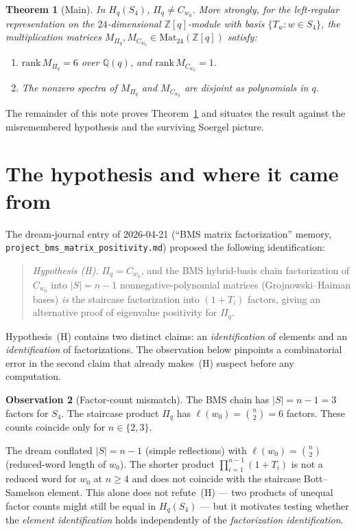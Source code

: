 \documentclass[11pt]{article}
\newtheorem{theorem}{Theorem}
\theoremstyle{definition}
\newtheorem{observation}[theorem]{Observation}
\begin{document}
\begin{theorem}[Main]\label{thm:main}
In $H_q(S_4)$, $\Pi_q \ne C_{w_0}$. More strongly, for the left-regular
representation on the $24$-dimensional $\mathbb{Z}[q]$-module with basis
$\{T_w : w \in S_4\}$, the multiplication matrices
$M_{\Pi_q}, M_{C_{w_0}} \in \mathrm{Mat}_{24}(\mathbb{Z}[q])$ satisfy:
\begin{enumerate}
\item $\mathrm{rank}\, M_{\Pi_q} = 6$ over $\mathbb{Q}(q)$, and
      $\mathrm{rank}\, M_{C_{w_0}} = 1$.
\item The nonzero spectra of $M_{\Pi_q}$ and $M_{C_{w_0}}$ are disjoint as
      polynomials in $q$.
\end{enumerate}
\end{theorem}

The remainder of this note proves Theorem~\ref{thm:main} and situates the
result against the misremembered hypothesis and the surviving Soergel
picture.

\section{The hypothesis and where it came from}\label{sec:hypothesis}

The dream-journal entry of 2026-04-21 (``BMS matrix factorization'' memory,
\texttt{project\_bms\_matrix\_positivity.md}) proposed the following
identification:
\begin{quote}
\emph{Hypothesis (H).} $\Pi_q = C_{w_0}$, and the BMS hybrid-basis chain
factorization of $C_{w_0}$ into $|S|=n-1$ nonnegative-polynomial matrices
(Grojnowski--Haiman bases) \emph{is} the staircase factorization into
$(1+T_i)$ factors, giving an alternative proof of eigenvalue positivity for
$\Pi_q$.
\end{quote}

Hypothesis~(H) contains two distinct claims: an \emph{identification} of
elements and an \emph{identification} of factorizations. The observation
below pinpoints a combinatorial error in the second claim that already
makes~(H) suspect before any computation.

\begin{observation}[Factor-count mismatch]\label{obs:count}
The BMS chain has $|S| = n-1 = 3$ factors for $S_4$. The staircase
product $\Pi_q$ has $\ell(w_0) = \binom{n}{2} = 6$ factors. These counts
coincide only for $n \in \{2,3\}$.
\end{observation}

The dream conflated $|S|=n-1$ (simple reflections) with $\ell(w_0)
=\binom{n}{2}$ (reduced-word length of $w_0$). The shorter product
$\prod_{i=1}^{n-1}(1+T_i)$ is not a reduced word for $w_0$ at $n\geq 4$ and
does not coincide with the staircase Bott--Samelson element. This alone does
not refute~(H) --- two products of unequal factor counts might still be
equal in $H_q(S_4)$ --- but it motivates testing whether the \emph{element
identification} holds independently of the \emph{factorization
identification}.
\end{document}
